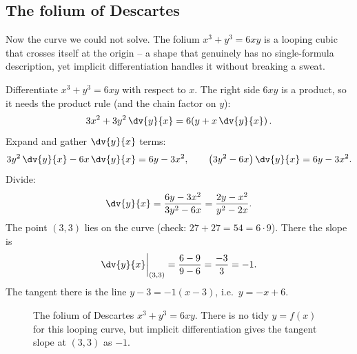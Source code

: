 \subsection{The folium of Descartes}

Now the curve we could not solve. The folium $x^3 + y^3 = 6xy$ is a looping cubic that crosses
itself at the origin -- a shape that genuinely has no single-formula description, yet implicit
differentiation handles it without breaking a sweat.

\begin{example}
\label{ch13:ex-folium}
Differentiate $x^3 + y^3 = 6xy$ with respect to $x$. The right side $6xy$ is a product, so it needs
the product rule (and the chain factor on $y$):
\[
3x^2 + 3y^2\,\dv{y}{x} = 6\!\left(y + x\,\dv{y}{x}\right).
\]
Expand and gather $\dv{y}{x}$ terms:
\[
3y^2\,\dv{y}{x} - 6x\,\dv{y}{x} = 6y - 3x^2,
\qquad
\left(3y^2 - 6x\right)\dv{y}{x} = 6y - 3x^2.
\]
Divide:
\[
\dv{y}{x} = \frac{6y - 3x^2}{3y^2 - 6x} = \frac{2y - x^2}{y^2 - 2x}.
\]
The point $(3,3)$ lies on the curve (check: $27 + 27 = 54 = 6\cdot 9$). There the slope is
\[
\dv{y}{x}\bigg|_{(3,3)} = \frac{6 - 9}{9 - 6} = \frac{-3}{3} = -1.
\]
The tangent there is the line $y - 3 = -1(x-3)$, i.e.\ $y = -x + 6$.
\end{example}

\begin{figure}[H]
\centering
{}
\caption{The folium of Descartes $x^3+y^3=6xy$. There is no tidy $y=f(x)$ for this looping curve, but
implicit differentiation gives the tangent slope at $(3,3)$ as $-1$.}
\label{ch13:fig-folium}
\end{figure}

